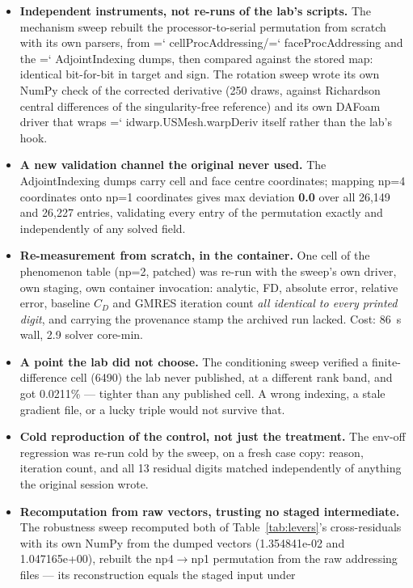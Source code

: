 \documentclass[11pt,a4paper]{article}
\newcommand{\artifact}[1]{{\small\ttfamily\hyphenchar\font=`\-\relax
  \def\_{\textunderscore\allowbreak}#1}}
\begin{document}
\begin{itemize}
\item \textbf{Independent instruments, not re-runs of the lab's scripts.} The mechanism sweep
rebuilt the processor-to-serial permutation from scratch with its own parsers, from
\artifact{cellProcAddressing}/\artifact{faceProcAddressing} and the \artifact{AdjointIndexing}
dumps, then compared against the stored map: identical bit-for-bit in target and sign. The
rotation sweep wrote its own NumPy check of the corrected derivative (250 draws, against
Richardson central differences of the singularity-free reference) and its own DAFoam driver
that wraps \artifact{idwarp.USMesh.warpDeriv} itself rather than the lab's hook.
\item \textbf{A new validation channel the original never used.} The AdjointIndexing dumps
carry cell and face centre coordinates; mapping np=4 coordinates onto np=1 coordinates gives
max deviation \textbf{0.0} over all 26{,}149 and 26{,}227 entries, validating every entry of
the permutation exactly and independently of any solved field.
\item \textbf{Re-measurement from scratch, in the container.} One cell of the phenomenon table
(np=2, patched) was re-run with the sweep's own driver, own staging, own container
invocation: analytic, FD, absolute error, relative error, baseline \(C_D\) and GMRES iteration
count \emph{all identical to every printed digit}, and carrying the provenance stamp the
archived run lacked. Cost: 86~s wall, 2.9 solver core-min.
\item \textbf{A point the lab did not choose.} The conditioning sweep verified a
finite-difference cell (6490) the lab never published, at a different rank band, and got
0.0211\% --- tighter than any published cell. A wrong indexing, a stale gradient file, or a
lucky triple would not survive that.
\item \textbf{Cold reproduction of the control, not just the treatment.} The env-off
regression was re-run cold by the sweep, on a fresh case copy: reason, iteration count, and
all 13 residual digits matched independently of anything the original session wrote.
\item \textbf{Recomputation from raw vectors, trusting no staged intermediate.} The robustness
sweep recomputed both of Table~\ref{tab:levers}'s cross-residuals with its own NumPy from the
dumped vectors (1.354841e-02 and 1.047165e+00), rebuilt the np4\(\rightarrow\)np1 permutation
from the raw addressing files --- its reconstruction equals the staged input under

\end{itemize}
\end{document}
